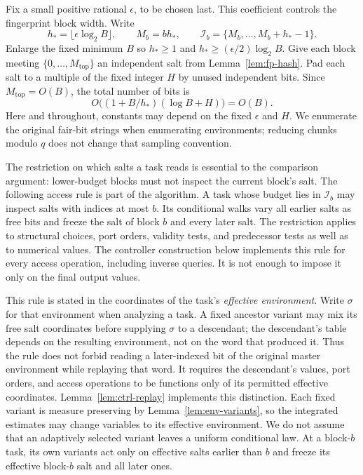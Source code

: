 Fix a small positive rational $\epsilon$, to be chosen last.
This coefficient controls the fingerprint block width. Write
\begin{equation}
 h_*=\lfloor\epsilon\log_2 B\rfloor,\qquad
 M_b=bh_*,\qquad
 \mathcal I_b=\{M_b,\ldots,M_b+h_*-1\}.
 \label{eq:fp-blocks}
\end{equation}
Enlarge the fixed minimum $B$ so $h_*\ge1$ and
$h_*\ge(\epsilon/2)\log_2B$.  Give each block meeting
$\{0,\ldots,M_{\mathrm{top}}\}$ an independent salt from
Lemma~\ref{lem:fp-hash}.  Pad each salt to a multiple of the fixed integer
$H$ by unused independent bits.  Since $M_{\mathrm{top}}=O(B)$, the total
number of bits is
\begin{equation}
 O\bigl((1+B/h_*)(\log B+H)\bigr)=O(B).
 \label{eq:fp-salt-space}
\end{equation}
Here and throughout, constants may depend on the fixed $\epsilon$ and $H$.
We enumerate the original fair-bit strings when enumerating environments;
reducing chunks modulo $q$ does not change that sampling convention.

The restriction on which salts a task reads is essential to the comparison argument: lower-budget blocks must not inspect the current block's salt. The following access rule is part of the algorithm.  A task whose budget
lies in $\mathcal I_b$ may inspect salts with indices at most $b$.  Its
conditional walks vary all earlier salts as free bits and freeze the salt
of block $b$ and every later salt.  The restriction applies to structural
choices, port orders, validity tests, and predecessor tests as well as to
numerical values.  The controller construction below implements this rule
for every access operation, including inverse queries.  It is not enough
to impose it only on the final output values.

This rule is stated in the coordinates of the task's \emph{effective
environment}.  Write $\sigma$ for that environment when analyzing a
task.  A fixed ancestor variant may mix its free salt coordinates before
supplying $\sigma$ to a descendant; the descendant's table depends on
the resulting environment, not on the word that produced it.  Thus the
rule does not forbid reading a later-indexed bit of the original master
environment while replaying that word.  It requires the descendant's
values, port orders, and access operations to be functions only of
its permitted effective coordinates.  Lemma~\ref{lem:ctrl-replay}
implements this distinction.  Each fixed variant is measure preserving
by Lemma~\ref{lem:env-variants}, so the integrated estimates may change
variables to its effective environment.  We do not assume that an
adaptively selected variant leaves a uniform conditional law.  At a
block-$b$ task, its own variants act only on effective salts earlier
than $b$ and freeze its effective block-$b$ salt and all later ones.

